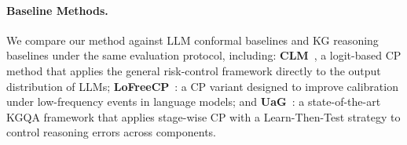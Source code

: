 \documentclass{article}
\theoremstyle{plain}
\theoremstyle{definition}
\theoremstyle{remark}
\begin{document}
\begin{table}[h]
\centering
\caption{Dataset statistics and subgraph properties.}
\setlength{\tabcolsep}{0.8mm}
\label{tab:dataset_stats}
\end{table}
\vspace{-8pt}


\paragraph{Baseline Methods.} We compare our method against LLM conformal baselines and KG reasoning baselines under the same evaluation protocol, including: \textbf{CLM}~\citep{quach2024conformallanguagemodeling}, a logit-based CP method that applies the general risk-control framework directly to the output distribution of LLMs; \textbf{LoFreeCP}~\citep{Su2024}: a CP variant designed to improve calibration under low-frequency events in language models; and \textbf{UaG}~\citep{Ni_Wang_Cheng_Blasch_Derr_2025}: a state-of-the-art KGQA framework that applies stage-wise CP with a Learn-Then-Test strategy to control reasoning errors across components.



\end{document}
